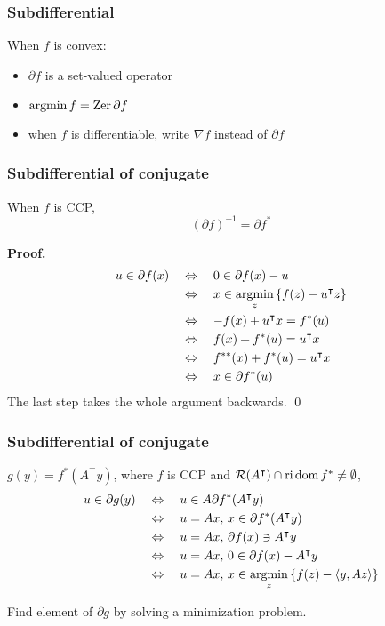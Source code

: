 \documentclass[10pt,mathserif]{beamer}
\begin{document}
\begin{frame}
\frametitle{Subdifferential}
When $f$ is convex:
\begin{itemize}
\item
$\partial f$ is a set-valued operator
\item
$\operatorname*{argmin} f = \mathrm{Zer}\, \partial f$
\item
when $f$ is differentiable, write $\nabla f$ instead of $\partial f$
\end{itemize}
\end{frame}

\begin{frame}
\frametitle{Subdifferential of conjugate}
When $f$ is CCP,
\[
    (\partial f)^{-1}=\partial f^*
\]

\vspace{0.2in}

\textbf{Proof.}
\begin{align*}
u \in \partial f(x)
\quad& \Leftrightarrow  \quad
0\in \partial f(x)-u\\
&\Leftrightarrow \quad
x \in \operatorname*{argmin}_ z\left\{f(z)-u^\intercal z\right\}\\
&\Leftrightarrow \quad
-f(x)+u^\intercal x =f^*(u)\\
&\Leftrightarrow \quad
f(x)+f^*(u)=u^\intercal x\\
&\Leftrightarrow \quad
f^{**}(x)+f^*(u)=u^\intercal x\\
&\Leftrightarrow \quad
x \in \partial f^* (u)
\end{align*}
The last step takes the whole argument backwards.
\qed
\end{frame}

\begin{frame}[label=subdiff-conj]
\frametitle{Subdifferential of conjugate}

$g(y)=f^*(A^\intercal y)$,
where $f$ is CCP and $ {\mathcal{R}}(A^\intercal)\cap \mathrm{ri}\,\mathrm{dom}\, f^*\ne \emptyset$,
\begin{align*}
u\in \partial g(y)
&\quad\Leftrightarrow\quad
u\in A \partial f^*(A^\intercal y)\nonumber\\
&\quad\Leftrightarrow\quad
u= A x,\,x\in \partial f^*(A^\intercal y)\nonumber\\
&\quad\Leftrightarrow\quad
u= A x,\,\partial f(x)\ni  A^\intercal y
\label{eq:subdiff-conj}
\\
&\quad\Leftrightarrow\quad
u= A x,\,0\in \partial f(x)-  A^\intercal y\nonumber\\
&\quad\Leftrightarrow\quad
u= A x,\,x\in \operatorname*{argmin}_z\left\{
f(z)-\langle y, Az\rangle
\right\}\nonumber
\end{align*}

\vspace{0.2in}
Find element of $\partial g$ by solving a minimization problem.
\end{frame}
\end{document}
